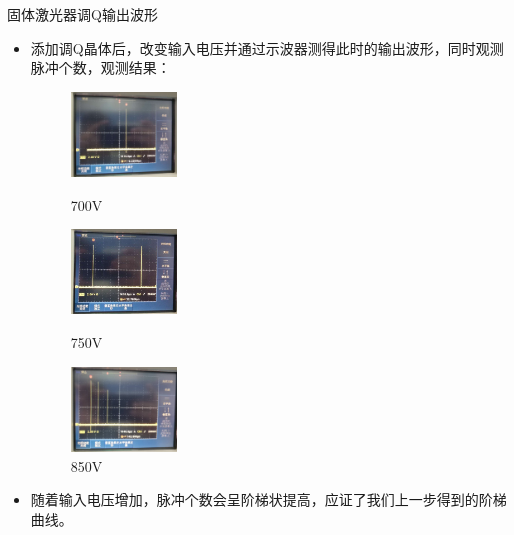 \documentclass{beamer}
\begin{document}
\begin{frame}{固体激光器调Q输出波形}
  \begin{itemize}
    \item 添加调Q晶体后，改变输入电压并通过示波器测得此时的输出波形，同时观测脉冲个数，观测结果：
    \begin{figure}[htbp]
      \centering
      \begin{minipage}[htbp]{80pt}
        \centering
        \includegraphics[width=80pt]{images/10.jpg}
        \caption{700V}
        \label{fig:4}
      \end{minipage}
      \hspace{10pt}%
      \begin{minipage}[htpb]{80pt}
        \centering
        \includegraphics[width=80pt]{images/11.jpg}
        \caption{750V}
        \label{fig:5}
      \end{minipage}
      \hspace{10pt}%
      \begin{minipage}[htpb]{80pt}
        \centering
        \includegraphics[width=80pt]{images/12.jpg}
        \caption{850V}
        \label{fig:5}
      \end{minipage}
      \end{figure}
    \item 随着输入电压增加，脉冲个数会呈阶梯状提高，应证了我们上一步得到的阶梯曲线。
  \end{itemize}
\end{frame}
\end{document}
